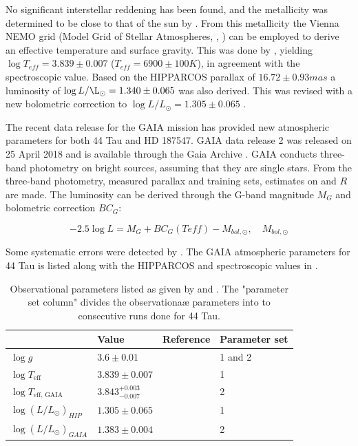 No significant interstellar reddening has been found, and the metallicity was determined to be close to that of the sun by \citet{mcnamara1985relations}. From this metallicity the Vienna NEMO grid (Model Grid of Stellar Atmospheres, \citet{nendwich2004interpolation}, \citet{heiter2002new}) can be employed to derive an effective temperature and surface gravity. This was done by \citet{lenz2008asteroseismic}, yielding $ \log T_{eff}= 3.839 \pm 0.007$ ($T_{eff} = 6900 \pm 100 K$), in agreement with the spectroscopic value. Based on the HIPPARCOS parallax of $16.72\pm 0.93 mas$ a luminosity of $\log L/\L_\odot = 1.340 \pm 0.065$ was also derived. This was revised with a new bolometric correction to $\log L/L_\odot = 1.305 \pm 0.065$ \citep{lenz2010delta}. 

The recent data release for the GAIA mission has provided new atmospheric parameters for both 44 Tau and HD 187547. GAIA data release 2 was released on 25 April 2018 and is available through the Gaia Archive \citep{brown2018gaia}. GAIA conducts three-band photometry on bright sources, assuming that they are single stars. From the three-band photometry, measured parallax and training sets, estimates on \teff and $R$ are made. 
The luminosity can be derived through the G-band magnitude $M_G$ and bolometric correction $BC_G$:

\begin{equation}
	-2.5\log L = M_G + BC_G(Teff) - M_{bol,\odot}, \quad M_{bol,\odot}
\end{equation}

Some systematic errors were detected by \citet{andrae2018gaia}. The GAIA atmospheric parameters for 44 Tau is listed along with the HIPPARCOS and spectroscopic values in . 

\begin{table}[htbp]
	\caption{Observational parameters listed as given by \citet{lenz2010delta} and \citet{brown2018gaia}. The "parameter set column" divides the observationaæ parameters into to consecutive runs done for 44 Tau.}
	\label{obsparams}
\centering
\begin{tabular}{|l|lll|}
\hline
                                                   & Value                                             & Reference  & Parameter set\\ \hline
$\log g $                                  &  $3.6 \pm 0.01$                            & \citep{zima2007high} & 1 and 2   \\
$\log T_\text{eff}$             & $3.839  \pm 0.007$                   &   \citep{lenz2010delta}  & 1 \\
$\log T_\text{eff, GAIA}$ &  $3.843^{+0.003}_{-0.007}$ & \citep{brown2018gaia} & 2\\
$\log (L/L_\odot)_{HIP}$                  &  $1.305 \pm 0.065$                          & \citep{lenz2010delta}  & 1   \\
$\log (L/L_\odot)_{GAIA}$& $1.383 \pm 0.004$                        &  \citep{brown2018gaia}  & 2 \\ \hline
\end{tabular}
\end{table}

